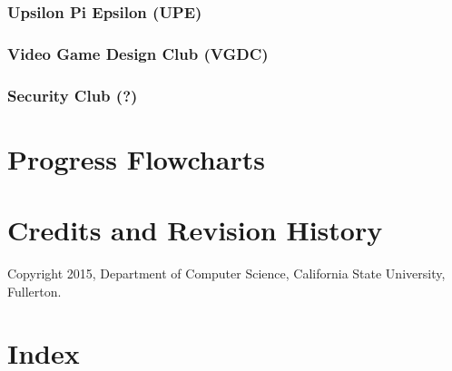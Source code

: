 \documentclass{book}
\begin{document}
\subsection{Upsilon Pi Epsilon (UPE)}
\subsection{Video Game Design Club (VGDC)}
\subsection{Security Club (?)}

\chapter{Progress Flowcharts}

\chapter{Credits and Revision History}

Copyright 2015, Department of Computer Science, California State University, Fullerton.

\chapter{Index}
\printindex
\end{document}
